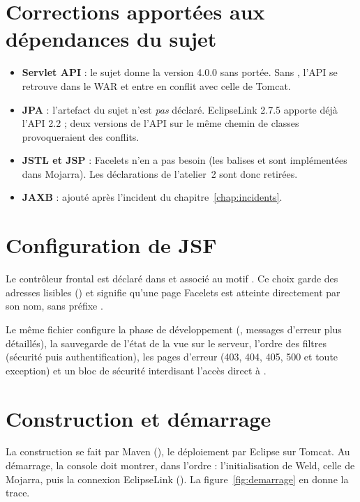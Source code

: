 \section{Corrections apportées aux dépendances du sujet}
\begin{itemize}
  \item \textbf{Servlet API} : le sujet donne la version 4.0.0 sans portée. Sans , l'API se retrouve
        dans le WAR et entre en conflit avec celle de Tomcat.
  \item \textbf{JPA} : l'artefact  du sujet n'est \emph{pas}
        déclaré. EclipseLink 2.7.5 apporte déjà l'API 2.2 ; deux versions de l'API sur le même chemin de classes
        provoqueraient des conflits.
  \item \textbf{JSTL et JSP} : Facelets n'en a pas besoin (les balises  et  sont implémentées dans
        Mojarra). Les déclarations de l'atelier~2 sont donc retirées.
  \item \textbf{JAXB} : ajouté après l'incident du chapitre~\ref{chap:incidents}.
\end{itemize}



\section{Configuration de JSF}
Le contrôleur frontal est déclaré dans  et associé au motif . Ce choix garde des adresses
lisibles () et signifie qu'une page Facelets est atteinte directement par son
nom, sans préfixe .



Le même fichier configure la phase de développement (, messages d'erreur plus
détaillés), la sauvegarde de l'état de la vue sur le serveur, l'ordre des filtres (sécurité puis authentification),
les pages d'erreur (403, 404, 405, 500 et toute exception) et un bloc de sécurité interdisant l'accès direct à
.

\section{Construction et démarrage}
La construction se fait par Maven (), le déploiement par Eclipse sur Tomcat. Au démarrage,
la console doit montrer, dans l'ordre : l'initialisation de Weld, celle de Mojarra, puis la connexion EclipseLink
(). La figure~\ref{fig:demarrage} en donne la trace.

